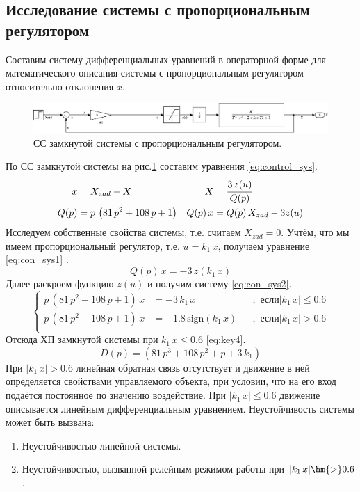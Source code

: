 \subsection{Исследование системы с пропорциональным регулятором}\label{title:PR}
Составим систему
дифференциальных уравнений в операторной форме  для математического описания системы с пропорциональным регулятором 
относительно отклонения $x$.
\begin{figure}[!h]\centering
\includegraphics[width=1.0\linewidth]{images/sim_P}
\caption{СС замкнутой системы с пропорциональным регулятором.}\label{fig:sim_P}
\end{figure}
По СС замкнутой системы на рис.\ref{fig:sim_P} составим уравнения \eqref{eq:control_sys}.
\begin{equation}
    \begin{aligned} \label{eq:control_sys}
       x&=X_{zad}-X & X&=\cfrac{3\,z(u)}{Q(p)}\\
       Q(p)&=p\,\left(81\,p^2+108\,p+1\right)&Q(p)\,x&=Q(p)\,X_{zad}-3z(u)\\
    \end{aligned}
\end{equation}
Исследуем собственные свойства системы, т.е. считаем $X_{zad}=0$.
 Учтём, что мы имеем пропорциональный регулятор, т.е. $u=k_1\,x$, получаем уравнение
 \eqref{eq:con_sys1}
.
\begin{equation} \label{eq:con_sys1}
Q(p)\,x=-3\,z(k_1\,x)
\end{equation}
Далее раскроем функцию $z(u)$ и получим систему \eqref{eq:con_sys2}.
\begin{equation}
    \left\{
    \begin{aligned} \label{eq:con_sys2}
       p\,\left(81\,p^2+108\,p+1\right)\,x&=-3\,k_1\,x&&, \text{ если}|k_1\,x|\le 0.6\\
       p\,\left(81\,p^2+108\,p+1\right)\,x&=-1.8\,\mathrm{sign}\left(k_1\,x\right)&&, \text{ если}|k_1\,x|> 0.6\\
    \end{aligned}
    \right.
\end{equation}
Отсюда ХП замкнутой системы при $k_1\,x\le0.6$ \eqref{eq:key4}.
\begin{equation} \label{eq:key4}
D(p)=\left(81\,p^3+108\,p^2+p+3\,k_1\right)
\end{equation}
При $|k_1\,x|>0.6$ линейная обратная связь отсутствует и движение в ней определяется свойствами управляемого объекта, при условии, что на его вход подаётся постоянное по значению воздействие. При $|k_1\,x|\le0.6$ движение описывается линейным дифференциальным уравнением. Неустойчивость системы может быть вызвана:
\begin{enumerate}
\item 
Неустойчивостью линейной системы.
\item 
Неустойчивостью, вызванной релейным режимом работы при $|k_1\,x|\hm{>}0.6$.
\end{enumerate}

